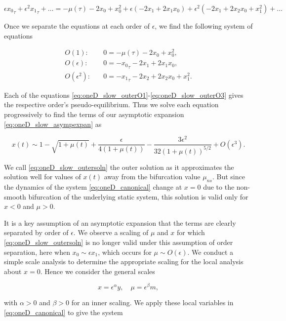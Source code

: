 \begin{equation*}
\epsilon {x_0}_\tau +\epsilon^2 {x_1}_\tau+\ldots= -\mu(\tau) -2x_0+x_0^2+\epsilon(-2x_1+2x_1x_0)+\epsilon^2(-2x_1+2x_2x_0+x_1^2)+\ldots
\end{equation*}

Once we separate the equations at each order of $\epsilon$, we find the following system of equations

\begin{align}
\label{eq:oneD_slow_outerO1}
O(1):& \quad 0=-\mu(\tau)-2x_0+x_0^2,\\
\label{eq:oneD_slow_outerO2}
O(\epsilon):& \quad 0=-{x_0}_\tau-2x_1+2x_1 x_0,\\
\label{eq:oneD_slow_outerO3}
O(\epsilon^2):& \quad 0=-{x_1}_\tau-2x_2+2x_2x_0+x_1^2.
\end{align}

Each of the equations \eqref{eq:oneD_slow_outerO1}-\eqref{eq:oneD_slow_outerO3} gives the respective order's pseudo-equilibrium. Thus we solve each equation progressively to find the terms of our asymptotic expansion \eqref{eq:oneD_slow_asympexpan} as

\begin{equation}\label{eq:oneD_slow_outersoln}
x(t)\sim 1-\sqrt{1+\mu(t)}+ \frac{\epsilon}{4(1+\mu(t))}-\frac{3\epsilon^2}{32(1+\mu(t))^{5/2}}+O(\epsilon^3).
\end{equation}

We call \eqref{eq:oneD_slow_outersoln} the outer solution as it approximates the solution well for values of $x(t)$ away from the bifurcation value $\mu_{ns}$. But since the dynamics of the system \eqref{eq:oneD_canonical} change at $x=0$ due to the non-smooth bifurcation of the underlying static system, this solution is valid only for $x<0$ and $\mu>0$.


It is a key assumption of an asymptotic expansion that the terms are clearly separated by order of $\epsilon$. We observe a scaling of $\mu$ and $x$ for which \eqref{eq:oneD_slow_outersoln} is no longer valid under this assumption of order separation, here when $x_0\sim \epsilon x_1$, which occurs for $\mu\sim O(\epsilon)$. We conduct a simple scale analysis to determine the appropriate scaling for the local analysis about $x=0$. Hence we consider the general scales

\begin{equation*}
x=\epsilon^\alpha y,\quad \mu = \epsilon^\beta m,
\end{equation*}

with $\alpha>0$ and $\beta>0$ for an inner scaling. We apply these local variables in \eqref{eq:oneD_canonical} to give the system

